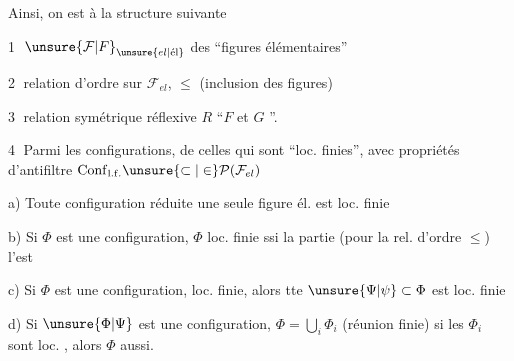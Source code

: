 
Ainsi, on est  à la structure suivante

\textcircled{1} $\unsure{\mathcal{F}|F}_{\unsure{el|\text{él}}}$  des ``figures élémentaires''

\textcircled{2} relation d'ordre sur $\mathcal{F}_{el}$, $\leq$ (inclusion des figures)

\textcircled{3} relation symétrique réflexive $R$  ``$F$ et $G$ \uline{}''.\  



\textcircled{4}  Parmi les configurations,      de celles qui sont ``loc. finies'', avec  propriétés d'antifiltre \unsure{;|,} $\mathrm{Conf}_{\mathrm{l.f.}}\unsure{\subset|\in}\mathcal{P}(\mathcal{F}_{el})$

a) Toute configuration réduite  une seule figure él. est loc. finie


b) Si $\Phi$ est une configuration, $\Phi$ loc. finie ssi la  partie  (pour la rel. d'ordre $\leq$) l'est

c) Si $\Phi$ est une configuration,  loc. finie, alors tte $\unsure{\Psi|\psi}\subset\Phi$ est loc. finie

d) Si $\unsure{\Phi|\Psi}$ est une configuration, $\Phi=\bigcup_{i}\Phi_i$ (réunion finie) si les $\Phi_i$ sont loc. , alors $\Phi$ aussi.
